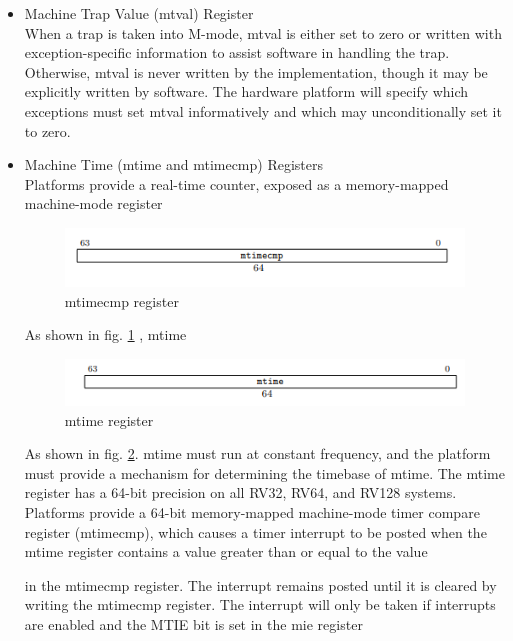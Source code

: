 \documentclass[../main.tex]{subfiles}
\begin{document}
\begin{itemize}
    \item Machine Trap Value (mtval) Register\\
       	   When a trap is taken into M-mode, mtval is either set to zero or written with exception-specific information to assist software in handling the trap. Otherwise, mtval is never written by the implementation, though it may be explicitly written by software. The hardware platform will specify which exceptions must set mtval informatively and which may unconditionally set it to zero.
		    \item  Machine Time (mtime and mtimecmp) Registers\\
            Platforms provide a real-time counter, exposed as a memory-mapped machine-mode register
            \begin{figure}[h]
            \centering
            \includegraphics[width=10 cm]{diagrams/mtimecmp.PNG}
            \caption{mtimecmp register}
            \label{fig:mtimecmp}
            \end{figure}As shown in fig. \ref{fig:mtimecmp}
            , mtime 
            \begin{figure}[h]
            \centering
            \includegraphics[width=10 cm]{diagrams/mtime.PNG}
            \caption{mtime register}
            \label{fig:mtime}
            \end{figure}As shown in fig. \ref{fig:mtime}.
mtime must run at constant frequency, and the platform must provide a mechanism for determining
the timebase of mtime.
The mtime register has a 64-bit precision on all RV32, RV64, and RV128 systems.
Platforms provide
a 64-bit memory-mapped machine-mode timer compare register (mtimecmp), which causes a timer
interrupt to be posted when the mtime register contains a value greater than or equal to the value

in the mtimecmp register. The interrupt remains posted until it is cleared by writing the mtimecmp
register. The interrupt will only be taken if interrupts are enabled and the MTIE bit is set in the
mie register\\
\\


\end{itemize}
\end{document}
